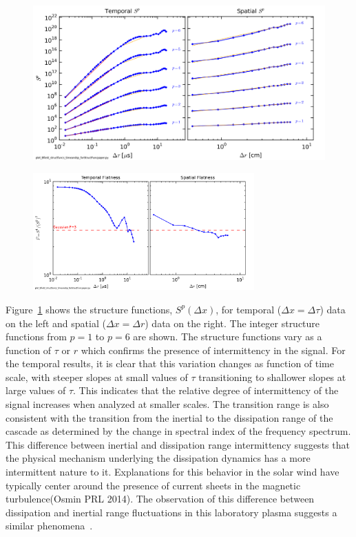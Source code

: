 \documentclass[aps,prl,amsmath,amssymb,reprint,superscriptaddress]{revtex4-1} %
\begin{document}
\begin{figure}[!htbp]
\centerline{
\includegraphics[width=17cm]{Bmod_timeandspace_StructureFunction100313Shots41to80_forStructFuncpaper.png}}
\caption{\label{fig:structfuncs} }
\end{figure}

\begin{figure}[!htbp]
\centerline{
\includegraphics[width=8.5cm]{Bmod_timeandspace_Flatness100313Shots41to80_forStructFuncpaper.png}}
\caption{\label{fig:flatness} }
\end{figure}

Figure~\ref{fig:structfuncs} shows the structure functions, $S^{p}(\Delta x)$, for temporal ($\Delta x = \Delta \tau$) data on the left and spatial ($\Delta x = \Delta r$) data on the right. The integer structure functions from $p=1$ to $p=6$ are shown. The structure functions vary as a function of $\tau$ or $r$ which confirms the presence of intermittency in the signal. For the temporal results, it is clear that this variation changes as function of time scale, with steeper slopes at small values of $\tau$ transitioning to shallower slopes at large values of $\tau$. This indicates that the relative degree of intermittency of the signal increases when analyzed at smaller scales. The transition range is also consistent with the transition from the inertial to the dissipation range of the cascade as determined by the change in spectral index of the frequency spectrum. This difference between inertial and dissipation range intermittency suggests that the physical mechanism underlying the dissipation dynamics has a more intermittent nature to it. Explanations for this behavior in the solar wind have typically center around the presence of current sheets in the magnetic turbulence(Osmin PRL 2014). The observation of this difference between dissipation and inertial range fluctuations in this laboratory plasma suggests a similar phenomena~\cite{schaffner2014b}. 
\end{document}
